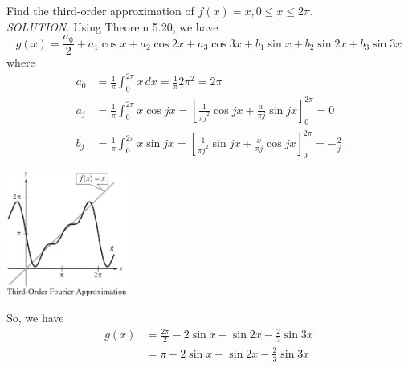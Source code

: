 \documentclass{article}
\newcommand\ddfrac[2]{\frac{\displaystyle #1}{\displaystyle #2}}
\begin{document}
    Find the third-order approximation of $f(x) = x, 0 \le x \le 2\pi$.\\
    \textit{ \textcolor{blue5}{SOLUTION.} } Using Theorem 5.20, we have
    \[g(x) = \ddfrac{a_0}{2} + a_1 \cos{x} + a_2 \cos{2x} + a_3 \cos{3x} + b_1 \sin{x} + b_2 \sin{2x} + b_3 \sin{3x}\]
    where 
    \begin{equation*}
        \begin{split}
            a_0 &= \ddfrac{1}{\pi}\int_0^{2\pi} x\,dx = \ddfrac{1}{\pi} 2\pi^2 = 2\pi \\
            a_j &= \ddfrac{1}{\pi}\int_0^{2\pi} x \cos{jx} = \left[ \ddfrac{1}{\pi j^2} \cos{jx} + \ddfrac{x}{\pi j} \sin{jx} \right]_0^{2\pi} = 0\\
            b_j &=  \ddfrac{1}{\pi}\int_0^{2\pi} x \sin{jx} =  \left[ \ddfrac{1}{\pi j^2} \sin{jx} + \ddfrac{x}{\pi j} \cos{jx} \right]_0^{2\pi} =  -\ddfrac{2}{j}
        \end{split}
    \end{equation*}
    \begin{minipage}{0.31\linewidth}
        \includegraphics[width = 4cm]{images/3fourier.png}
    \end{minipage}
    \begin{minipage}{0.59\linewidth}
        So, we have 
        \begin{equation*}
            \begin{split}
                g(x) &= \ddfrac{2\pi}{2} - 2 \sin{x} - \sin{2x} - \ddfrac{2}{3} \sin{3x} \\
                     &= \pi - 2 \sin{x} - \sin{2x} - \ddfrac{2}{3} \sin{3x}
            \end{split}
        \end{equation*}
    \end{minipage}
\end{document}
